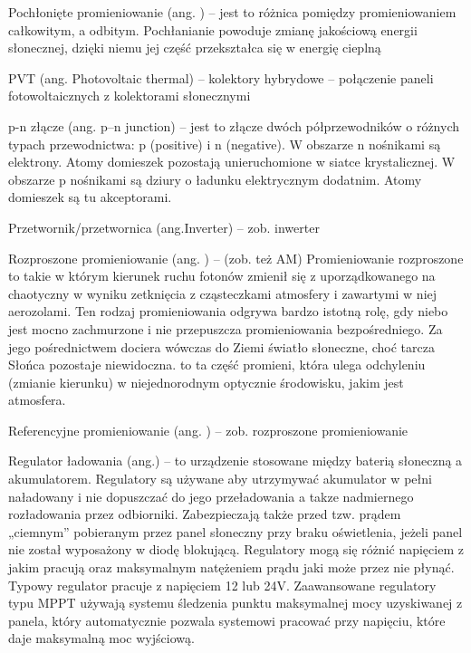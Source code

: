 \documentclass[12pt,a4paper]{article}
\begin{document}
Pochłonięte promieniowanie (ang. ) – jest to różnica pomiędzy promieniowaniem całkowitym, a odbitym. Pochłanianie powoduje zmianę jakościową energii słonecznej, dzięki niemu jej część przekształca się w energię cieplną


PVT (ang. Photovoltaic thermal) – kolektory hybrydowe – połączenie paneli fotowoltaicznych z kolektorami słonecznymi

p-n złącze (ang. p–n junction) – jest to złącze dwóch półprzewodników o różnych typach przewodnictwa: p (positive) i n (negative). W obszarze n nośnikami są elektrony. Atomy domieszek pozostają unieruchomione w siatce krystalicznej. W obszarze p nośnikami są dziury o ładunku elektrycznym dodatnim. Atomy domieszek są tu akceptorami.

Przetwornik/przetwornica (ang.Inverter) –  zob. inwerter

Rozproszone promieniowanie (ang. ) –  (zob. też AM) Promieniowanie rozproszone to takie w którym kierunek ruchu fotonów zmienił się z uporządkowanego na chaotyczny w wyniku zetknięcia z cząsteczkami atmosfery i zawartymi w niej aerozolami. Ten rodzaj promieniowania odgrywa bardzo istotną rolę, gdy niebo jest mocno zachmurzone i nie przepuszcza promieniowania bezpośredniego. Za jego pośrednictwem dociera wówczas do Ziemi światło słoneczne, choć tarcza Słońca pozostaje niewidoczna. to ta część promieni, która ulega odchyleniu (zmianie kierunku) w niejednorodnym optycznie środowisku, jakim jest  atmosfera.

Referencyjne promieniowanie (ang. ) – zob. rozproszone promieniowanie

Regulator ładowania (ang.) – to urządzenie stosowane między baterią słoneczną a akumulatorem. Regulatory są używane aby utrzymywać akumulator w pełni naładowany i nie dopuszczać do jego przeładowania a takze nadmiernego rozładowania przez odbiorniki. Zabezpieczają także przed tzw. prądem „ciemnym” pobieranym przez panel słoneczny przy braku oświetlenia, jeżeli panel nie został wyposażony w diodę blokującą. Regulatory mogą się różnić napięciem z jakim pracują oraz maksymalnym natężeniem prądu jaki może przez nie płynąć. Typowy regulator pracuje z napięciem 12 lub 24V. Zaawansowane regulatory typu MPPT używają systemu śledzenia punktu maksymalnej mocy uzyskiwanej z panela, który automatycznie pozwala systemowi pracować przy napięciu, które daje maksymalną moc wyjściową.
\end{document}
